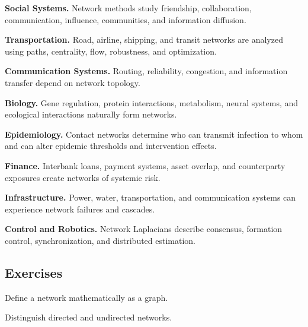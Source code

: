 \begin{applicationbox}

\textbf{Social Systems.}
Network methods study friendship, collaboration, communication, influence,
communities, and information diffusion.

\medskip

\textbf{Transportation.}
Road, airline, shipping, and transit networks are analyzed using paths,
centrality, flow, robustness, and optimization.

\medskip

\textbf{Communication Systems.}
Routing, reliability, congestion, and information transfer depend on network
topology.

\medskip

\textbf{Biology.}
Gene regulation, protein interactions, metabolism, neural systems, and
ecological interactions naturally form networks.

\medskip

\textbf{Epidemiology.}
Contact networks determine who can transmit infection to whom and can alter
epidemic thresholds and intervention effects.

\medskip

\textbf{Finance.}
Interbank loans, payment systems, asset overlap, and counterparty exposures
create networks of systemic risk.

\medskip

\textbf{Infrastructure.}
Power, water, transportation, and communication systems can experience
network failures and cascades.

\medskip

\textbf{Control and Robotics.}
Network Laplacians describe consensus, formation control, synchronization,
and distributed estimation.

\end{applicationbox}

\subsection{Exercises}
\label{subsec:network-science-exercises}

\begin{exercise}[1]
Define a network mathematically as a graph.
\end{exercise}

\begin{exercise}[1]
Distinguish directed and undirected networks.
\end{exercise}

